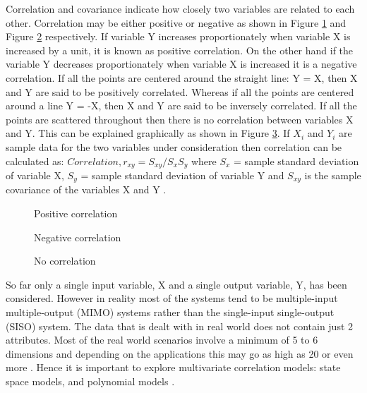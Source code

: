 \documentclass[article,type=msc,colorback,12pt,accentcolor=tud8b,table]{tudthesis}
\begin{document}
	Correlation and covariance indicate how closely two variables are related to each other. Correlation may be either positive or negative as shown in Figure \ref{fig:postivie_corr} and Figure \ref{fig:negative_corr} respectively. If variable Y increases proportionately when variable X is increased by a unit, it is known as positive correlation. On the other hand if the variable Y decreases proportionately when variable X is increased it is a negative correlation. If all the points are centered around the straight line: Y = X, then X and Y are said to be positively correlated. Whereas if all the points are centered around a line Y = -X, then X and Y are said to be inversely correlated. If all the points are scattered throughout then there is no correlation between variables X and Y. This can be explained graphically as shown in Figure \ref{fig:no_corr}. If $X_i$ and $Y_i$ are sample data for the two variables under consideration then correlation can be calculated as: $ Correlation, r_{xy} = S_{xy} / S_x S_y $ where $S_x$ = sample standard deviation of variable X, $S_y$ = sample standard deviation of variable Y and $S_{xy}$ is the sample covariance of the variables X and Y \cite{freedman2009statistical}. 

 
 \begin{figure}[H]
 	\begin{center}
 	\end{center}
 	\caption{Positive correlation}
 	\label{fig:postivie_corr}
 \end{figure}
 
 \begin{figure}[H]
 	\begin{center}
 	\end{center}
 	\caption{Negative correlation}
 	\label{fig:negative_corr}
 \end{figure}
 
 \begin{figure}[H]
 	\begin{center}
 	\end{center}
 	\caption{No correlation}
 	\label{fig:no_corr}
 \end{figure}
 

So far only a single input variable, X and a single output variable, Y, has been considered. However in reality most of the systems tend to be multiple-input multiple-output (MIMO) systems rather than the single-input single-output (SISO) system. The data that is dealt with in real world does not contain just 2 attributes. Most of the real world scenarios involve a minimum of 5 to 6 dimensions and depending on the applications this may go as high as 20 or even more \cite{friendly2002corrgrams, li2010judging}. Hence it is important to explore multivariate correlation models: state space models, and polynomial models \cite{ljung1987system, ljung1998system, ljung1999system}.
\end{document}
